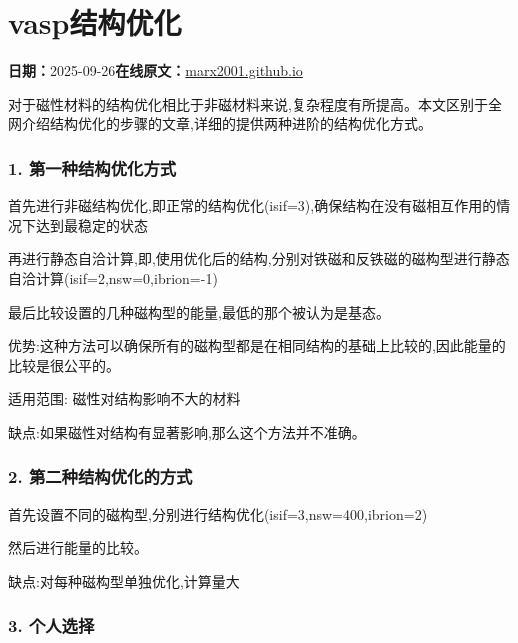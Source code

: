 \documentclass[lang=cn,scheme=chinese,color=blue,device=normal,toc=onecol,math=cm]{elegantbook}
\begin{document}
\section{vasp结构优化}
\begin{articlemeta}
\textbf{日期：}2025-09-26\hfill\textbf{在线原文：}\href{https://marx2001.github.io/sci-note\_posts/20250926-geo1}{marx2001.github.io}
\end{articlemeta}

对于磁性材料的结构优化相比于非磁材料来说,复杂程度有所提高。本文区别于全网介绍结构优化的步骤的文章,详细的提供两种进阶的结构优化方式。\par


\subsubsection{1. 第一种结构优化方式}


首先进行非磁结构优化,即正常的结构优化(isif=3),确保结构在没有磁相互作用的情况下达到最稳定的状态\par


再进行静态自洽计算,即,使用优化后的结构,分别对铁磁和反铁磁的磁构型进行静态自洽计算(isif=2,nsw=0,ibrion=-1)\par


最后比较设置的几种磁构型的能量,最低的那个被认为是基态。\par


优势:这种方法可以确保所有的磁构型都是在相同结构的基础上比较的,因此能量的比较是很公平的。\par


适用范围: 磁性对结构影响不大的材料\par


缺点:如果磁性对结构有显著影响,那么这个方法并不准确。\par


\subsubsection{2. 第二种结构优化的方式}


首先设置不同的磁构型,分别进行结构优化(isif=3,nsw=400,ibrion=2)\par


然后进行能量的比较。\par


缺点:对每种磁构型单独优化,计算量大\par


\subsubsection{3. 个人选择}
\end{document}
